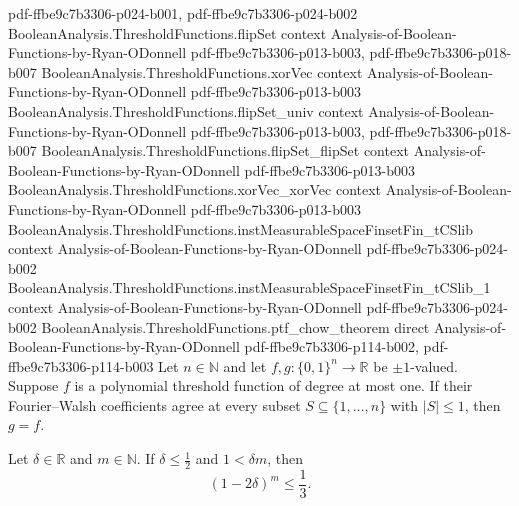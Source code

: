 \begin{theorem}
  {pdf-ffbe9c7b3306-p024-b001,
    pdf-ffbe9c7b3306-p024-b002}
\proofstep
  {BooleanAnalysis.ThresholdFunctions.flipSet}
  {context}
  {Analysis-of-Boolean-Functions-by-Ryan-ODonnell}
  {pdf-ffbe9c7b3306-p013-b003,
    pdf-ffbe9c7b3306-p018-b007}
\proofstep
  {BooleanAnalysis.ThresholdFunctions.xorVec}
  {context}
  {Analysis-of-Boolean-Functions-by-Ryan-ODonnell}
  {pdf-ffbe9c7b3306-p013-b003}
\proofstep
  {BooleanAnalysis.ThresholdFunctions.flipSet_univ}
  {context}
  {Analysis-of-Boolean-Functions-by-Ryan-ODonnell}
  {pdf-ffbe9c7b3306-p013-b003,
    pdf-ffbe9c7b3306-p018-b007}
\proofstep
  {BooleanAnalysis.ThresholdFunctions.flipSet_flipSet}
  {context}
  {Analysis-of-Boolean-Functions-by-Ryan-ODonnell}
  {pdf-ffbe9c7b3306-p013-b003}
\proofstep
  {BooleanAnalysis.ThresholdFunctions.xorVec_xorVec}
  {context}
  {Analysis-of-Boolean-Functions-by-Ryan-ODonnell}
  {pdf-ffbe9c7b3306-p013-b003}
\proofstep
  {BooleanAnalysis.ThresholdFunctions.instMeasurableSpaceFinsetFin_tCSlib}
  {context}
  {Analysis-of-Boolean-Functions-by-Ryan-ODonnell}
  {pdf-ffbe9c7b3306-p024-b002}
\proofstep
  {BooleanAnalysis.ThresholdFunctions.instMeasurableSpaceFinsetFin_tCSlib_1}
  {context}
  {Analysis-of-Boolean-Functions-by-Ryan-ODonnell}
  {pdf-ffbe9c7b3306-p024-b002}
\proofstep
  {BooleanAnalysis.ThresholdFunctions.ptf_chow_theorem}
  {direct}
  {Analysis-of-Boolean-Functions-by-Ryan-ODonnell}
  {pdf-ffbe9c7b3306-p114-b002,
    pdf-ffbe9c7b3306-p114-b003}
Let $n\in\mathbb N$ and let $f,g:\{0,1\}^n\to\mathbb R$ be $\pm1$-valued. Suppose $f$ is
a polynomial threshold function of degree at most one. If their Fourier–Walsh
coefficients agree at every subset $S\subseteq\{1,\ldots,n\}$ with $|S|\le1$, then
$g=f$.
\end{theorem}

\begin{lemma}
\leanok
{}
Let $\delta\in\mathbb R$ and $m\in\mathbb N$. If $\delta\le\tfrac12$ and $1<\delta m$,
then
\[
(1-2\delta)^m\le\frac13.
\]
\end{lemma}

